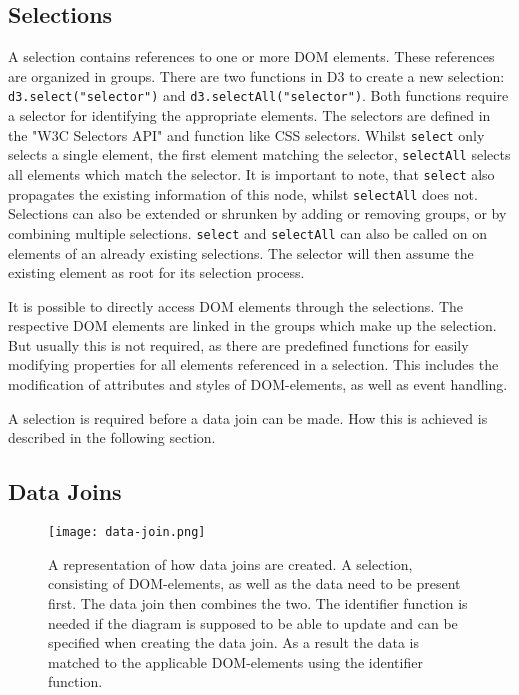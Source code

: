 \subsection{Selections}

A selection contains references to one or more DOM elements. These references are organized in groups. There are two functions in D3 to create a new selection: \verb|d3.select("selector")| and \verb|d3.selectAll("selector")|. Both functions require a selector for identifying the appropriate elements. The selectors are defined in the "W3C Selectors API" \cite{w3c_selectors_api} and function like CSS selectors. Whilst \verb|select| only selects a single element, the first element matching the selector, \verb|selectAll| selects all elements which match the selector. It is important to note, that \verb|select| also propagates the existing information of this node, whilst \verb|selectAll| does not. Selections can also be extended or shrunken by adding or removing groups, or by combining multiple selections. \verb|select| and \verb|selectAll| can also be called on on elements of an already existing selections. The selector will then assume the existing element as root for its selection process.

It is possible to directly access DOM elements through the selections. The respective DOM elements are linked in the groups which make up the selection. But usually this is not required, as there are predefined functions for easily modifying properties for all elements referenced in a selection. This includes the modification of attributes and styles of DOM-elements, as well as event handling.

A selection is required before a data join can be made. How this is achieved is described in the following section.


\subsection{Data Joins}

\begin{figure}[ht]
    \texttt{[image: data-join.png]}
    \captionsetup{width=0.9\textwidth}
    \caption[data-joins]{A representation of how data joins are created. A selection, consisting of DOM-elements, as well as the data need to be present first. The data join then combines the two. The identifier function is needed if the diagram is supposed to be able to update and can be specified when creating the data join. As a result the data is matched to the applicable DOM-elements using the identifier function.}
    \label{fig:data-joins}
\end{figure}

